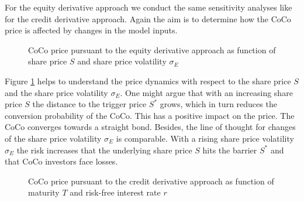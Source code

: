 For the equity derivative approach we conduct the same sensitivity analyses like for the credit derivative approach. Again the aim is to determine how the CoCo price is affected by changes in the model inputs. 

\begin{figure}[H]
\centering
    \caption[CoCo price pursuant to the equity derivative approach as function of share price and share price volatility]{CoCo price pursuant to the equity derivative approach as function of share price $S$ and share price volatility $\sigma_E$}
  \label{fig:ed1}
  \end{figure}
  
Figure \ref{fig:ed1} helps to understand the price dynamics with respect to the share price $S$ and the share price volatility $\sigma_E$. One might argue that with an increasing share price $S$ the distance to the trigger price $S^*$ grows, which in turn reduces the conversion probability of the CoCo. This has a positive impact on the price. The CoCo converges towards a straight bond. Besides, the line of thought for changes of the share price volatility $\sigma_E$ is comparable. With a rising share price volatility $\sigma_E$ the risk increases that the underlying share price $S$ hits the barrier $S^*$ and that CoCo investors face losses. \\%

\begin{figure}[H]
\centering
{}
    \caption[CoCo price pursuant to the equity derivative approach as function of maturity and interest rate]{CoCo price pursuant to the credit derivative approach as function of maturity $T$ and risk-free interest rate $r$}
  \label{fig:ed2}
  \end{figure}

